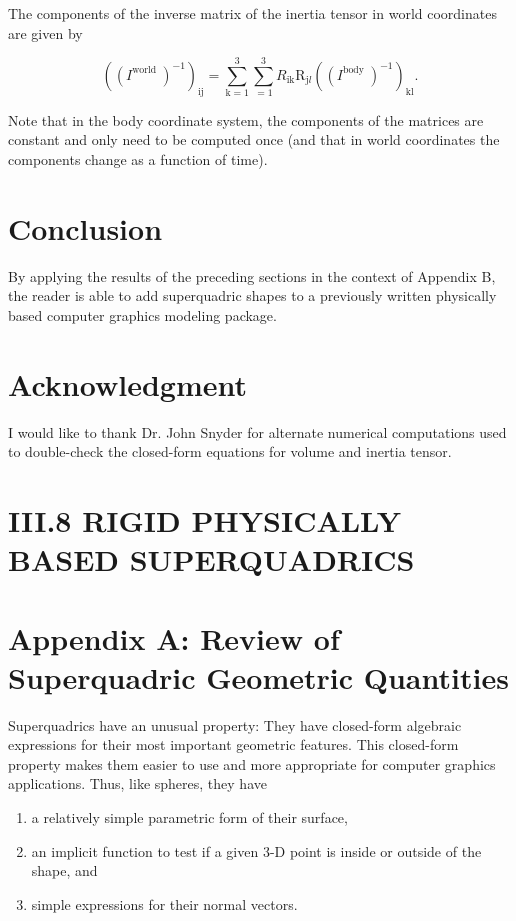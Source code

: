 The components of the inverse matrix of the inertia tensor in world coordinates are given by

$$
\left(\left(I^{\text {world }}\right)^{-1}\right)_{\mathrm{ij}}=\sum_{\mathrm{k}=1}^{3} \sum_{=1}^{3} R_{\mathrm{ik}} \mathrm{R}_{\mathrm{j} l}\left(\left(I^{\text {body }}\right)^{-1}\right)_{\mathrm{kl}} .
$$

Note that in the body coordinate system, the components of the matrices are constant and only need to be computed once (and that in world coordinates the components change as a function of time).

\section{Conclusion}
By applying the results of the preceding sections in the context of Appendix B, the reader is able to add superquadric shapes to a previously written physically based computer graphics modeling package.

\section{Acknowledgment}
I would like to thank Dr. John Snyder for alternate numerical computations used to double-check the closed-form equations for volume and inertia tensor.

\section{III.8 RIGID PHYSICALLY BASED SUPERQUADRICS}
\section{Appendix A: Review of Superquadric Geometric Quantities}
Superquadrics have an unusual property: They have closed-form algebraic expressions for their most important geometric features. This closed-form property makes them easier to use and more appropriate for computer graphics applications. Thus, like spheres, they have

\begin{enumerate}
  \item a relatively simple parametric form of their surface,

  \item an implicit function to test if a given 3-D point is inside or outside of the shape, and

  \item simple expressions for their normal vectors.

\end{enumerate}

